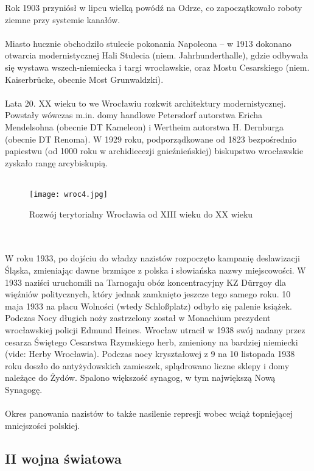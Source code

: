 \documentclass[12pt]{article}
\begin{document}
Rok 1903 przyniósł w lipcu wielką powódź na Odrze, co zapoczątkowało roboty ziemne przy systemie kanałów.\\\\
Miasto hucznie obchodziło stulecie pokonania Napoleona – w 1913 dokonano otwarcia modernistycznej Hali Stulecia (niem. Jahrhunderthalle), gdzie odbywała się wystawa wszech-niemiecka i targi wrocławskie, oraz Mostu Cesarskiego (niem. Kaiserbrücke, obecnie Most Grunwaldzki).\\\\
Lata 20. XX wieku to we Wrocławiu rozkwit architektury modernistycznej. Powstały wówczas m.in. domy handlowe Petersdorf autorstwa Ericha Mendelsohna (obecnie DT Kameleon) i Wertheim autorstwa H. Dernburga (obecnie DT Renoma). W 1929 roku, podporządkowane od 1823 bezpośrednio papiestwu (od 1000 roku w archidiecezji gnieźnieńskiej) biskupstwo wrocławskie zyskało rangę arcybiskupią.\\\\
\begin{figure}[h]
    \centering
    \texttt{[image: wroc4.jpg]}
    \caption{Rozwój terytorialny Wrocławia od XIII wieku do XX wieku}
    \label{fig:wroc4}
\end{figure}\\\\
W roku 1933, po dojściu do władzy nazistów rozpoczęto kampanię deslawizacji Śląska, zmieniając dawne brzmiące z polska i słowiańska nazwy miejscowości. W 1933 naziści uruchomili na Tarnogaju obóz koncentracyjny KZ Dürrgoy dla więźniów politycznych, który jednak zamknięto jeszcze tego samego roku. 10 maja 1933 na placu Wolności (wtedy Schloßplatz) odbyło się palenie książek. Podczas Nocy długich noży zastrzelony został w Monachium prezydent wrocławskiej policji Edmund Heines. Wrocław utracił w 1938 swój nadany przez cesarza Świętego Cesarstwa Rzymskiego herb, zmieniony na bardziej niemiecki (vide: Herby Wrocławia). Podczas nocy kryształowej z 9 na 10 listopada 1938 roku doszło do antyżydowskich zamieszek, splądrowano liczne sklepy i domy należące do Żydów. Spalono większość synagog, w tym największą Nową Synagogę.\\\\
Okres panowania nazistów to także nasilenie represji wobec wciąż topniejącej mniejszości polskiej.

\subsection{II wojna światowa}
\end{document}

